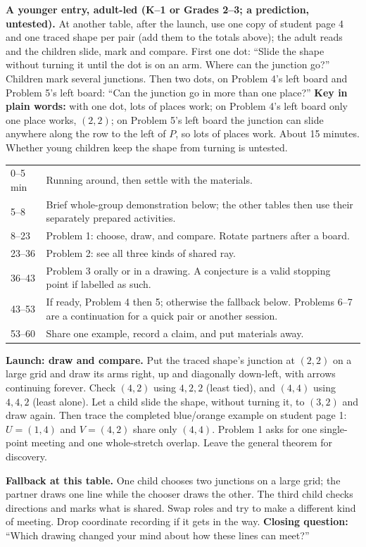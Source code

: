 \documentclass[11pt,letterpaper]{article}
\newcommand{\head}[1]{\par\vspace{4pt}{\large\bfseries #1}\par\vspace{1pt}}
\begin{document}
\textbf{A younger entry, adult-led (K--1 or Grades 2--3; a prediction, untested).} At another table, after the launch, use one copy of student page 4 and one traced shape per pair (add them to the totals above); the adult reads and the children slide, mark and compare. First one dot: ``Slide the shape without turning it until the dot is on an arm. Where can the junction go?'' Children mark several junctions. Then two dots, on Problem 4's left board and Problem 5's left board: ``Can the junction go in more than one place?'' \textbf{Key in plain words:} with one dot, lots of places work; on Problem 4's left board only one place works, $(2,2)$; on Problem 5's left board the junction can slide anywhere along the row to the left of $P$, so lots of places work. About 15 minutes. Whether young children keep the shape from turning is untested.
\newpage
\head{The hour}
\par\noindent\begin{tabularx}{\linewidth}{@{}p{.72in}X@{}}
0--5 min & Running around, then settle with the materials.\\
5--8 & Brief whole-group demonstration below; the other tables then use their separately prepared activities.\\
8--23 & Problem 1: choose, draw, and compare. Rotate partners after a board.\\
23--36 & Problem 2: see all three kinds of shared ray.\\
36--43 & Problem 3 orally or in a drawing. A conjecture is a valid stopping point if labelled as such.\\
43--53 & If ready, Problem 4 then 5; otherwise the fallback below. Problems 6--7 are a continuation for a quick pair or another session.\\
53--60 & Share one example, record a claim, and put materials away.
\end{tabularx}

\textbf{Launch: draw and compare.} Put the traced shape's junction at $(2,2)$ on a large grid and draw its arms right, up and diagonally down-left, with arrows continuing forever. Check $(4,2)$ using $4,2,2$ (least tied), and $(4,4)$ using $4,4,2$ (least alone). Let a child slide the shape, without turning it, to $(3,2)$ and draw again. Then trace the completed blue/orange example on student page 1: $U=(1,4)$ and $V=(4,2)$ share only $(4,4)$. Problem 1 asks for one single-point meeting and one whole-stretch overlap. Leave the general theorem for discovery.

\textbf{Fallback at this table.} One child chooses two junctions on a large grid; the partner draws one line while the chooser draws the other. The third child checks directions and marks what is shared. Swap roles and try to make a different kind of meeting. Drop coordinate recording if it gets in the way. \textbf{Closing question:} ``Which drawing changed your mind about how these lines can meet?''
\end{document}
